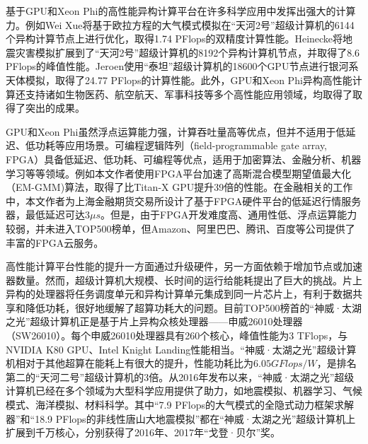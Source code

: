 \documentclass[degree=doctor]{thuthesis}
\begin{document}
基于GPU和Xeon Phi的高性能异构计算平台在许多科学应用中发挥出强大的计算力。例如Wei Xue将基于欧拉方程的大气模式模拟在“天河2号”超级计算机的6144个异构计算节点上进行优化，取得1.74 PFlops的双精度计算性能\cite{xue2015ultra}。Heinecke将地震灾害模拟扩展到了“天河2号”超级计算机的8192个异构计算机节点，并取得了8.6 PFlops的峰值性能\cite{heinecke2014petascale}。Jeroen使用“泰坦”超级计算机的18600个GPU节点进行银河系天体模拟，取得了24.77 PFlops的计算性能\cite{bedorf201424}。此外，GPU和Xeon Phi异构高性能计算还支持诸如生物医药\cite{tumeo2010accelerating,chen2008gpu}、航空航天\cite{habib2012universe,kampolis2010cfd}、军事科技\cite{ariga2014fast,fronckowiak2009using}等多个高性能应用领域，均取得了取得了突出的成果。

GPU和Xeon Phi虽然浮点运算能力强，计算吞吐量高等优点，但并不适用于低延迟、低功耗等应用场景。可编程逻辑阵列（field-programmable gate array, FPGA）具备低延迟、低功耗、可编程等优点，适用于加密算法\cite{elbirt2000fpga,elbirt2000fpga,hauser1997garp}、金融分析\cite{zhang2005reconfigurable,jin2013optimising,tse2010reconfigurable,becker2015maxeler}、机器学习\cite{irick2008hardware,zhang2015optimizing,wang2017dlau}等等领域。例如本文作者使用FPGA平台加速了高斯混合模型期望值最大化（EM-GMM)算法，取得了比Titan-X GPU提升39倍的性能\cite{he2017fully}。在金融相关的工作中，本文作者为上海金融期货交易所设计了基于FPGA硬件平台的低延迟行情服务器\cite{fu2017nanosecond,he2017exploring,fu2017accelerating}，最低延迟可达$3\mu s$。但是，由于FPGA开发难度高、通用性低、浮点运算能力较弱，并未进入TOP500榜单，但Amazon、阿里巴巴、腾讯、百度等公司提供了丰富的FPGA云服务\cite{tarafdar2018designing}。

高性能计算平台性能的提升一方面通过升级硬件，另一方面依赖于增加节点或加速器数量。然而，超级计算机大规模、长时间的运行给能耗提出了巨大的挑战\cite{reed2015exascale}。片上异构的处理器将任务调度单元和异构计算单元集成到同一片芯片上，有利于数据共享和降低功耗，很好地缓解了超算功耗大的问题。目前TOP500榜首的“神威·太湖之光”超级计算机正是基于片上异构众核处理器\cite{fu2016sunway}——申威26010处理器（SW26010）。每个申威26010处理器具有260个核心，峰值性能为3 TFlops，与NVIDIA K80 GPU、Intel Knight Landing性能相当\cite{einkemmer2017evaluation,sodani2016knights}。“神威·太湖之光”超级计算机相对于其他超算在能耗上有很大的提升，性能功耗比为$6.05GFlops/W$，是排名第二的“天河二号”超级计算机的3倍。从2016年发布以来，“神威·太湖之光”超级计算机已经在多个领域为大型科学应用提供了助力，如地震模拟\cite{fu201718}、机器学习\cite{fang2017swdnn}、气候模式\cite{yang201610m,fu2016refactoring}、海洋模拟\cite{qiao2016highly}、材料科学\cite{zhang2016extreme}。其中“7.9 PFlops的大气模式的全隐式动力框架求解器”和“18.9 PFlops的非线性唐山大地震模拟”都在“神威·太湖之光”超级计算机上扩展到千万核心，分别获得了2016年、2017年“戈登·贝尔”奖。
\end{document}
